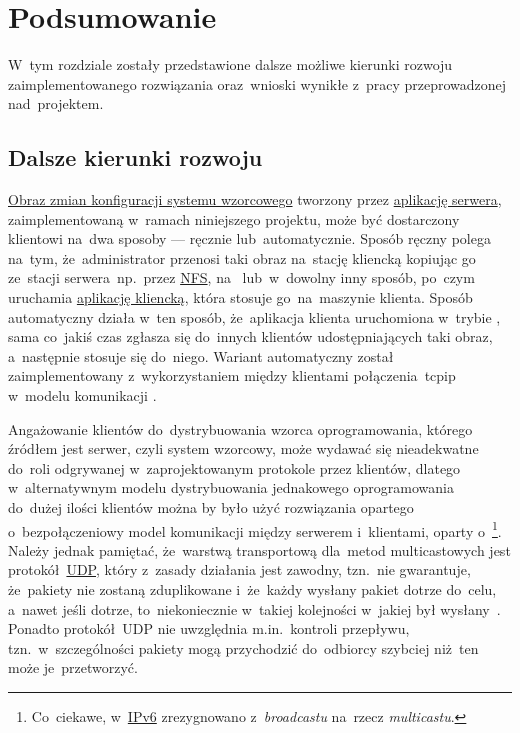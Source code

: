 \documentclass[thesis]{subfiles}
\begin{document}
\chapter{Podsumowanie}

W~tym rozdziale zostały przedstawione dalsze możliwe kierunki rozwoju zaimplementowanego rozwiązania oraz~wnioski wynikłe z~pracy przeprowadzonej nad~projektem.

\section{Dalsze kierunki rozwoju}

\hyperref[sec:obraz-zmian-konfiguracji]{Obraz zmian konfiguracji systemu wzorcowego} tworzony przez \hyperref[sec:srv-app]{aplikację serwera}, zaimplementowaną w~ramach niniejszego projektu, może być dostarczony klientowi na~dwa sposoby --- ręcznie lub~automatycznie. Sposób ręczny polega na~tym, że~administrator przenosi taki obraz na~stację kliencką kopiując go ze~stacji serwera~np.~przez \href{https://en.wikipedia.org/wiki/Network_File_System}{NFS}, na~ lub~w~dowolny inny sposób, po~czym uruchamia \hyperref[sec:cli-app]{aplikację kliencką}, która stosuje go~na~maszynie klienta. Sposób automatyczny działa w~ten sposób, że~aplikacja klienta uruchomiona w~trybie , sama co~jakiś czas zgłasza się do~innych klientów udostępniających taki obraz, a~następnie stosuje się do~niego. Wariant automatyczny został zaimplementowany z~wykorzystaniem między klientami połączenia~\gls{tcpip} w~modelu komunikacji .

Angażowanie klientów do~dystrybuowania wzorca oprogramowania, którego źródłem jest serwer, czyli system wzorcowy, może wydawać się nieadekwatne do~roli odgrywanej w~zaprojektowanym protokole przez klientów, dlatego w~alternatywnym modelu dystrybuowania jednakowego oprogramowania do~dużej ilości klientów można by było użyć rozwiązania opartego o~bezpołączeniowy model komunikacji między serwerem i~klientami, oparty o~\footnote{Co~ciekawe, w~\href{https://en.wikipedia.org/wiki/IPv6}{IPv6} zrezygnowano z~\emph{broadcastu} na~rzecz \emph{multicastu}.}. Należy jednak pamiętać, że~warstwą transportową dla~metod multicastowych jest protokół~\href{https://en.wikipedia.org/wiki/User_Datagram_Protocol}{UDP}, który z~zasady działania jest zawodny, tzn.~nie gwarantuje, że~pakiety nie zostaną zduplikowane i~że~każdy wysłany pakiet dotrze do~celu, a~nawet jeśli dotrze, to~niekoniecznie w~takiej kolejności w~jakiej był wysłany~\cite{rfc1112}. Ponadto protokół~UDP nie uwzględnia m.in.~kontroli przepływu, tzn.~w~szczególności pakiety mogą przychodzić do~odbiorcy szybciej niż~ten może je~przetworzyć.
\end{document}
